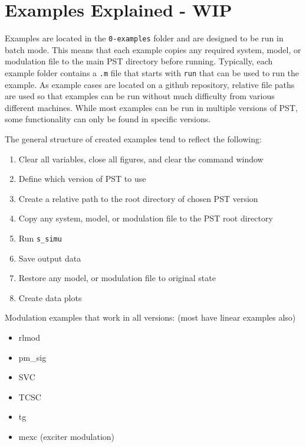 \chapter{Examples Explained - WIP}
Examples are located in the \verb|0-examples| folder and are designed to be run in batch mode.
This means that each example copies any required system, model, or modulation file to the main PST directory before running.
Typically, each example folder contains a \verb|.m| file that starts with \verb|run| that can be used to run the example.
As example cases are located on a github repository, relative file paths are used so that examples can be run without much difficulty from various different machines.
While most examples can be run in multiple versions of PST, some functionality can only be found in specific versions.

\noindent The general structure of created examples tend to reflect the following:
\begin{enumerate}
\itemsep 0em
\item Clear all variables, close all figures, and clear the command window
\item Define which version of PST to use
\item Create a relative path to the root directory of chosen PST version
\item Copy any system, model, or modulation file to the PST root directory
\item Run \verb|s_simu|
\item Save output data
\item Restore any model, or modulation file to original state
\item Create data plots
\end{enumerate}



\pagebreak
Modulation examples that work in all versions: (most have linear examples also)
\begin{itemize}
 em
\item rlmod
\item pm\_sig
\item SVC
\item TCSC
\item tg
\item mexc (exciter modulation)
\end{itemize}


